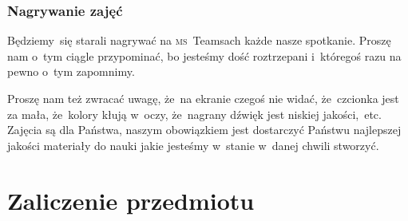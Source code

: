 \documentclass[10pt,t]{beamer}
\begin{document}
\begin{frame}
  \frametitle{Nagrywanie zajęć}


  Będziemy~się starali nagrywać na \textsc{ms}~Teamsach każde nasze
  spotkanie. Proszę nam o~tym ciągle przypominać, bo jesteśmy dość
  roztrzepani i~któregoś razu na pewno o~tym zapomnimy.

  Proszę nam też zwracać uwagę, że~na ekranie czegoś nie widać,
  że~czcionka jest za mała, że~kolory kłują w~oczy, że~nagrany dźwięk
  jest niskiej jakości,~etc. Zajęcia są dla Państwa, naszym obowiązkiem jest
  dostarczyć Państwu najlepszej jakości materiały do nauki jakie jesteśmy
  w~stanie w~danej chwili stworzyć.


\end{frame}










\section{Zaliczenie przedmiotu}
\end{document}

